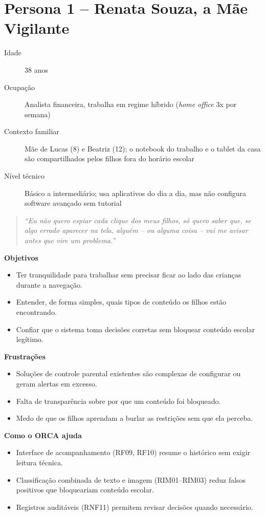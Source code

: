 \documentclass[
    12pt,           %
    oneside,        %
    a4paper,        %
    chapter=TITLE,  %
    english,        %
    brazil          %
]{abntex2}
\begin{document}
\section{Persona 1 -- Renata Souza, a Mãe Vigilante}

\begin{description}
  \item[Idade] 38 anos
  \item[Ocupação] Analista financeira, trabalha em regime híbrido (\textit{home office} 3x por semana)
  \item[Contexto familiar] Mãe de Lucas (8) e Beatriz (12); o notebook do trabalho e o tablet da casa são compartilhados pelos filhos fora do horário escolar
  \item[Nível técnico] Básico a intermediário; usa aplicativos do dia a dia, mas não configura software avançado sem tutorial
\end{description}

\begin{quote}
\textit{``Eu não quero espiar cada clique dos meus filhos, só quero saber
que, se algo errado aparecer na tela, alguém -- ou alguma coisa -- vai me
avisar antes que vire um problema.''}
\end{quote}

\textbf{Objetivos}
\begin{itemize}
  \item Ter tranquilidade para trabalhar sem precisar ficar ao lado das crianças durante a navegação.
  \item Entender, de forma simples, quais tipos de conteúdo os filhos estão encontrando.
  \item Confiar que o sistema toma decisões corretas sem bloquear conteúdo escolar legítimo.
\end{itemize}

\textbf{Frustrações}
\begin{itemize}
  \item Soluções de controle parental existentes são complexas de configurar ou geram alertas em excesso.
  \item Falta de transparência sobre por que um conteúdo foi bloqueado.
  \item Medo de que os filhos aprendam a burlar as restrições sem que ela perceba.
\end{itemize}

\textbf{Como o ORCA ajuda}
\begin{itemize}
  \item Interface de acompanhamento (RF09, RF10) resume o histórico sem exigir leitura técnica.
  \item Classificação combinada de texto e imagem (RIM01--RIM03) reduz falsos positivos que bloqueariam conteúdo escolar.
  \item Registros auditáveis (RNF11) permitem revisar decisões quando necessário.
\end{itemize}
\end{document}
